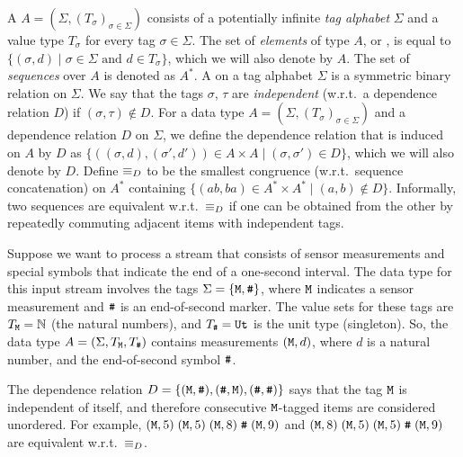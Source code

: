 A  $A = (\Sigma,(T_\sigma)_{\sigma \in \Sigma})$ consists of a potentially infinite \emph{tag alphabet} $\Sigma$ and a value type $T_\sigma$ for every tag $\sigma \in \Sigma$. The set of \emph{elements} of type $A$, or , is equal to $\{ (\sigma,d) \mid \text{$\sigma \in \Sigma$ and $d \in T_\sigma$} \}$, which we will also denote by $A$. The set of \emph{sequences} over $A$ is denoted as $A^*$. A  on a tag alphabet $\Sigma$ is a symmetric binary relation on $\Sigma$. We say that the tags $\sigma$, $\tau$ are \emph{independent} (w.r.t.\ a dependence relation $D$) if $(\sigma,\tau) \notin D$. For a data type $A = (\Sigma,(T_\sigma)_{\sigma \in \Sigma})$ and a dependence relation $D$ on $\Sigma$, we define the dependence relation that is induced on $A$ by $D$ as
$\{
   ((\sigma,d),(\sigma',d')) \in A \times A \mid
   (\sigma,\sigma') \in D
 \}
$,
which we will also denote by $D$. Define $\equiv_D$ to be the smallest congruence (w.r.t.\ sequence concatenation) on $A^*$ containing $\{ (ab,ba) \in A^* \times A^* \mid (a,b) \notin D \}$. Informally, two sequences are equivalent w.r.t.\ $\equiv_D$ if one can be obtained from the other by repeatedly commuting adjacent items with independent tags.

\begin{example}
\label{ex:dependence}
Suppose we want to process a stream that consists of sensor measurements and special symbols that indicate the end of a one-second interval. The data type for this input stream involves the tags $\Sigma = \{ \texttt{M}, \texttt{\#} \}$, where $\texttt{M}$ indicates a sensor measurement and $\texttt{\#}$ is an end-of-second marker. The value sets for these tags are $T_{\texttt{M}} = \mathbb{N}$ (the natural numbers), and $T_{\texttt{\#}} = \mathtt{Ut}$ is the unit type (singleton). So, the data type $A = (\Sigma,T_{\texttt{M}},T_{\texttt{\#}})$ contains measurements $(\texttt{M}, d)$, where $d$ is a natural number, and the end-of-second symbol $\texttt{\#}$.

The dependence relation $D = \{ (\texttt{M}, \texttt{\#}), (\texttt{\#}, \texttt{M}), (\texttt{\#},\texttt{\#}) \}$ says that the tag $\texttt{M}$ is independent of itself, and therefore consecutive $\texttt{M}$-tagged items are considered unordered. For example, $(\texttt{M}, 5) \; (\texttt{M}, 5) \; (\texttt{M}, 8) \; \texttt{\#} \; (\texttt{M}, 9)$ and $(\texttt{M}, 8) \; (\texttt{M}, 5) \; (\texttt{M}, 5) \; \texttt{\#} \; (\texttt{M}, 9)$ are equivalent w.r.t.\ $\equiv_D$.
\end{example}

